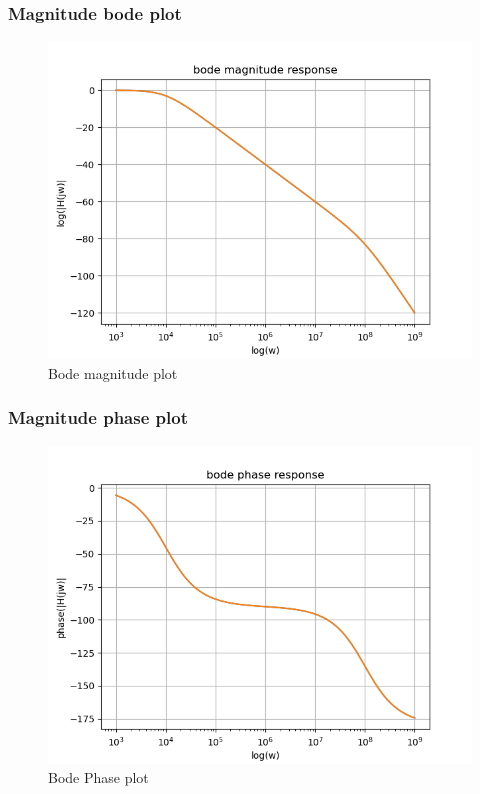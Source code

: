 \documentclass[11pt]{article}
\begin{document}
\subsubsection{Magnitude bode plot}
\begin{figure}[H]
    \centering
    \includegraphics[scale = 1]{Figure_10.png}
    \caption{Bode magnitude plot}
\end{figure}

\subsubsection{Magnitude phase plot}
\begin{figure}[H]
    \centering
    \includegraphics[scale = 1]{Figure_11.png}
    \caption{Bode Phase plot}
\end{figure}
\end{document}

